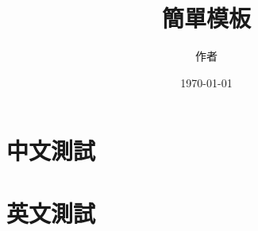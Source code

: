 \documentclass{article}
\title{簡單模板}
\author{作者}
\date{\today}
\begin{document}
\maketitle

\section{中文測試}
\zhlipsum[1]
\section{英文測試}
\lipsum[1]


\nocite{*}


\end{document}

